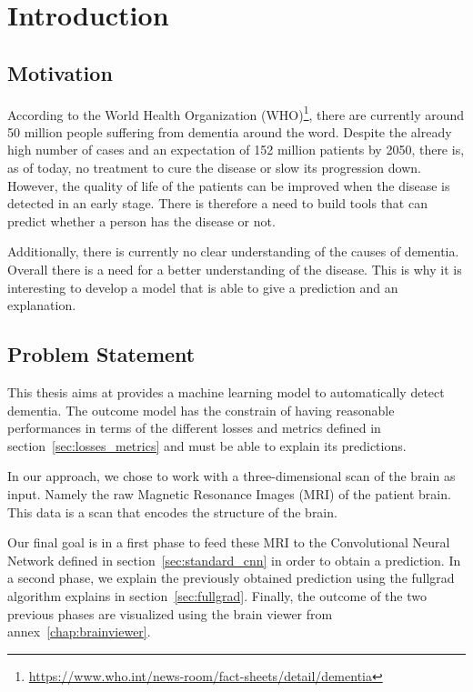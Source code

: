 \chapter{Introduction}

\section{Motivation}
\label{sec:motivation}
According to the World Health Organization (WHO)\footnote{\href{https://www.who.int/news-room/fact-sheets/detail/dementia}{https://www.who.int/news-room/fact-sheets/detail/dementia}}, there are currently around 50 million people suffering from dementia around the word. Despite the already high number of cases and an expectation of 152 million patients by 2050, there is, as of today, no treatment to cure the disease or slow its progression down. However, the quality of life of the patients can be improved when the disease is detected in an early stage. There is therefore a need to build tools that can predict whether a person has the disease or not.

Additionally, there is currently no clear understanding of the causes of dementia. Overall  there is a need for a better understanding of the disease. This is why it is interesting to develop a model that is able to give a prediction and an explanation.


\section{Problem Statement}
\label{sec:problem_statement}
This thesis aims at provides a machine learning model to automatically detect dementia. The outcome model has the constrain of having reasonable performances in terms of the different losses and metrics defined in section~\ref{sec:losses_metrics} and must be able to explain its predictions.

In our approach, we chose to work with a three-dimensional scan of the brain as input. Namely the raw Magnetic Resonance Images (MRI) of the patient brain. This data is a scan that encodes the structure of the brain. 

Our final goal is in a first phase to feed these MRI to the Convolutional Neural Network defined in section~\ref{sec:standard_cnn} in order to obtain a prediction. In a second phase, we explain the previously obtained prediction using the fullgrad algorithm explains in section~\ref{sec:fullgrad}. Finally, the outcome of the two previous phases are visualized using the brain viewer from annex~\ref{chap:brainviewer}.



